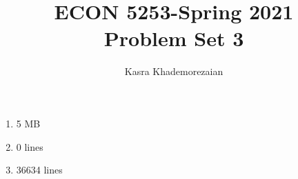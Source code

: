 \documentclass[12pt]{article}
\title{ECON 5253-Spring 2021\\
Problem Set 3}
\author{Kasra Khademorezaian}
\begin{document}
\maketitle
\begin{enumerate}
    \item 5 MB
    \item 0 lines
    \item 36634 lines
\end{enumerate}
    
\end{document}
